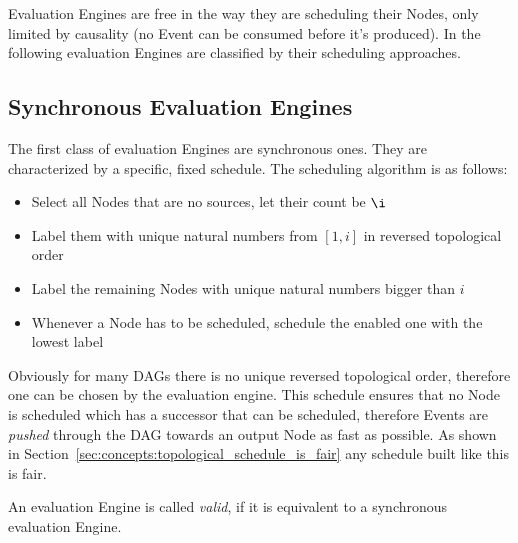 Evaluation Engines are free in the way they are scheduling their Nodes, only limited by causality (no Event can be consumed before it's produced).
In the following evaluation Engines are classified by their scheduling approaches.

\subsection{Synchronous Evaluation Engines}
\label{sec:concepts:behaviour_without_timing:synchronous}

The first class of evaluation Engines are synchronous ones.
They are characterized by a specific, fixed schedule.
The scheduling algorithm is as follows:

\begin{itemize}
  \item Select all Nodes that are no sources, let their count be \(\i\)
  \item Label them with unique natural numbers from \([1,i]\) in reversed topological order
  \item Label the remaining Nodes with unique natural numbers bigger than \(i\)
  \item Whenever a Node has to be scheduled, schedule the enabled one with the lowest label
\end{itemize}

Obviously for many DAGs there is no unique reversed topological order, therefore one can be chosen by the evaluation engine.
This schedule ensures that no Node is scheduled which has a successor that can be scheduled, therefore Events are \emph{pushed} through the DAG towards an output Node as fast as possible.
As shown in Section~\ref{sec:concepts:topological_schedule_is_fair} any schedule built like this is fair.

\begin{definition}[name = Valid evaluation Engines]\label{def:valid_eval_engine}
  An evaluation Engine is called \emph{valid}, if it is equivalent to a synchronous evaluation Engine.
\end{definition}


